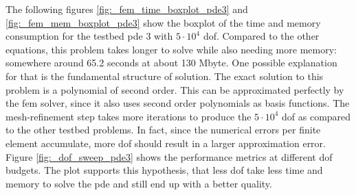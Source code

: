 \documentclass[./\jobname.tex]{subfiles}
\begin{document}
\begin{figure}[h]
	\centering
	\noindent{}
	\label{fig:_fem_mem_boxplot}
\end{figure}
The following figures \ref{fig:_fem_time_boxplot_pde3} and \ref{fig:_fem_mem_boxplot_pde3} show the boxplot of the time and memory consumption for the testbed \gls{pde} 3 with $5 \cdot 10^4$ \gls{dof}. Compared to the other equations, this problem takes longer to solve while also needing more memory: somewhere around 65.2 seconds at about 130 Mbyte. One possible explanation for that is the fundamental structure of solution. The exact solution to this problem is a polynomial of second order. This can be approximated perfectly by the \gls{fem} solver, since it also uses second order polynomials as basis functions. The mesh-refinement step takes more iterations to produce the $5 \cdot 10^4$ \gls{dof} as compared to the other testbed problems. In fact, since the numerical errors per finite element accumulate, more \gls{dof} should result in a larger approximation error. Figure \ref{fig:_dof_sweep_pde3} shows the performance metrics at different \gls{dof} budgets. The plot supports this hypothesis, that less \gls{dof} take less time and memory to solve the \gls{pde} and still end up with a better quality. 
\end{document}
